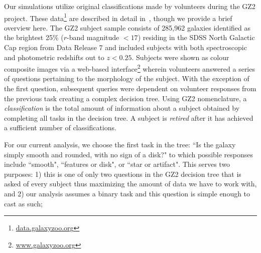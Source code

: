 \documentclass[twocolumn]{aastex6}%
\begin{document}
Our simulations utilize original classifications made by volunteers during the
 GZ2 project. These data\footnote{\url{data.galaxyzoo.org}} are described in detail
 in~\cite{Willett2013}, though we provide a brief overview here.  The GZ2 subject sample
 consists of 285,962 galaxies identified as the brightest 25\% ($r$-band magnitude $< 17$)
 residing in the SDSS North Galactic Cap region from Data Release 7 and included 
subjects with both spectroscopic and photometric redshifts out to $z < 0.25$.
Subjects were shown as colour composite images via a web-based
 interface\footnote{\url{www.galaxyzoo.org}} wherein volunteers answered a 
series of questions pertaining to the morphology of the subject. With the exception 
of the first question, subsequent queries were dependent on volunteer responses 
from the previous task creating a complex decision tree. Using GZ2 nomenclature, 
 a \textit{classification} is the total amount of information about a subject 
obtained by completing all tasks in the decision tree. A subject is \textit{retired} 
after it has achieved a sufficient number of classifications.


For our current analysis, we choose the first task in the tree: ``Is the galaxy simply 
smooth and rounded, with no sign of a disk?" to which possible responses include 
``smooth", ``features or disk", or ``star or artifact". This  serves 
two purposes: 1) this is one of only two questions in the GZ2 decision tree that 
is asked of every subject thus maximizing the amount of data we have to work with, 
and 2) our analysis assumes a binary task and this question is simple enough to cast as such;
\end{document}
